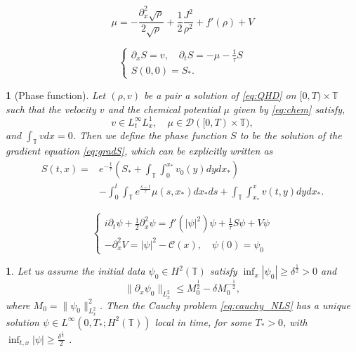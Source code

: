 \documentclass[10pt,a4paper]{amsart}
\newtheorem{defn}{}
\newtheorem{prop}{}
\def\T{{\mathbb T}}%
\def\d{{\partial}}
\begin{document}
\begin{equation}\label{eq:chem}
\mu=-\frac{\d_x^2\sqrt\rho}{2\sqrt\rho}+\frac12\frac{J^2}{\rho^2}+f'(\rho)+V
\end{equation}

\begin{equation}\label{eq:gradS}
\begin{cases}
\d_xS =v,\quad\d_t S=-\mu-\frac{1}{\tau}S \\
S(0,0)=S_*.
\end{cases}
\end{equation}

\begin{defn}[Phase function]\label{def:phase}
Let $(\rho,v)$ be a pair a solution of \eqref{eq:QHD} on $[0,T)\times\T$ such that the velocity $v$ and the chemical potential $\mu$ given by \eqref{eq:chem} satisfy, 
\[
v\in L^\infty_tL^1_x,\quad\mu\in \mathcal{D}([0,T)\times\T),
\]
and $\int_\T v dx=0$. Then we define the phase function $S$ to be the solution of the gradient equation \eqref{eq:gradS}, which can be explicitly written as
\begin{equation}\label{eq:defS}
\begin{aligned}
S(t,x)=&e^{-\frac{t}{\tau}} \left(S_*+\int_\T\int_0^{x_*}v_0(y)dydx_*\right)\\
&-\int_0^t \int_\T e^{\frac{s-t}{\tau}}\mu(s,x_*)dx_*ds+\int_\T\int_{x_*}^x v(t,y)dydx_*.
\end{aligned}
\end{equation}
\end{defn}

\begin{equation}\label{eq:cauchy_NLS}
\begin{cases}
i\d_t\psi+\frac12\d_x^2\psi=f'(|\psi|^2)\psi+\frac{1}{\tau}S\psi+V\psi\\
-\d_x^2 V=|\psi|^2-\mathcal{C}(x),\quad \psi(0)=\psi_0
\end{cases}
\end{equation}

\begin{prop}
Let us assume the initial data $\psi_0\in H^2(\T)$ satisfy $\inf_x|\psi_0|\geq \delta^\frac12 >0$ and 
\begin{equation}\label{eq:ini_1}
\|\d_x\psi_0\|_{L^2_x} \leq M_0^\frac12-\delta M_0^{-\frac12},
\end{equation}
where $M_0=\|\psi_0\|_{L^2_x}^2$. Then the Cauchy problem \eqref{eq:cauchy_NLS} has a unique solution $\psi\in L^\infty(0,T_*;H^2(\T))$ local in time, for some $T_*>0$, with $\inf_{t,x}|\psi|\geq \frac{\delta^\frac12}{2}$ .
\end{prop}
\end{document}
